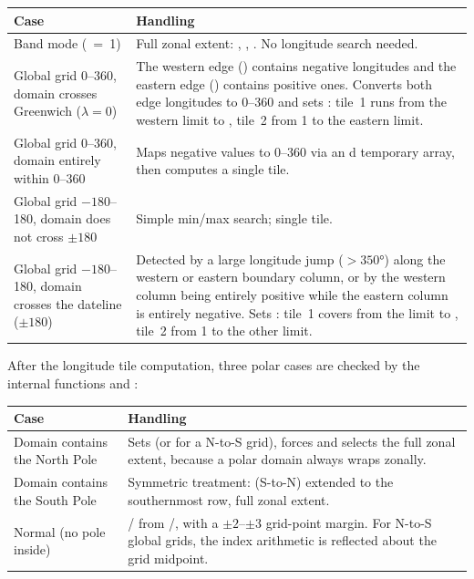 \begin{longtable}{L{4cm} L{10cm}}
  \toprule
  \textbf{Case} & \textbf{Handling} \\
  \midrule
  \endhead
  \bottomrule
  \endfoot
  Band mode (~=~1) &
    Full zonal extent: , ,
    . No longitude search needed. \\
  Global grid 0--360, domain crosses Greenwich ($\lambda=0$) &
    The western edge () contains negative longitudes
    and the eastern edge () contains positive ones.
    Converts both edge longitudes to 0--360 and sets
    : tile~1 runs from the western limit to ,
    tile~2 from 1 to the eastern limit. \\
  Global grid 0--360, domain entirely within 0--360 &
    Maps negative  values to 0--360 via an d
    temporary array, then computes a single tile. \\
  Global grid $-180$--180, domain does not cross $\pm180$ &
    Simple min/max search; single tile. \\
  Global grid $-180$--180, domain crosses the dateline ($\pm180$) &
    Detected by a large longitude jump ($>350°$) along the western or
    eastern boundary column, or by the western column being entirely
    positive while the eastern column is entirely negative. Sets
    : tile~1 covers from the limit to ,
    tile~2 from 1 to the other limit. \\
\end{longtable}

After the longitude tile computation, three polar cases are checked by the
internal functions  and :

\begin{longtable}{L{4cm} L{10cm}}
  \toprule
  \textbf{Case} & \textbf{Handling} \\
  \midrule
  \endhead
  \bottomrule
  \endfoot
  Domain contains the North Pole &
    Sets  (or  for a N-to-S grid),
    forces  and selects the full zonal extent, because
    a polar domain always wraps zonally. \\
  Domain contains the South Pole &
    Symmetric treatment:  (S-to-N) extended to the
    southernmost row, full zonal extent. \\
  Normal (no pole inside) &
    / from /,
    with a $\pm2$--$\pm3$ grid-point margin. For N-to-S global grids,
    the index arithmetic is reflected about the grid midpoint. \\
\end{longtable}

